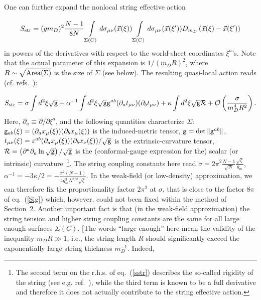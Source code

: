 \documentclass[a4paper,12pt]{article}
\begin{document}
One can further expand the nonlocal string effective action

\begin{equation}
\label{snonloc}
S_{\rm str}=(gm_D)^2\frac{N-1}{8N}\int\limits_{\Sigma(C)}^{}d\sigma_{\mu\nu}(\vec x(\xi))
\int\limits_{\Sigma(C)}^{}d\sigma_{\mu\nu}(\vec x(\xi'))D_{m_D}\left(\vec x(\xi)-\vec x(\xi')\right)
\end{equation}
in powers of the derivatives with respect to the world-sheet coordinates $\xi^a$'s. Note that the actual parameter of this expansion
is $1/(m_DR)^2$, where $R\sim\sqrt{{\rm Area}(\Sigma)}$ is the size of $\Sigma$ (see below). The resulting quasi-local action reads
(cf. refs.~\cite{dva, cristina}):

\begin{equation}
\label{sstr}
S_{\rm str}=\sigma\int d^2\xi\sqrt{\sf g}+
\alpha^{-1}\int d^2\xi\sqrt{\sf g}{\sf g}^{ab}
(\partial_at_{\mu\nu})(\partial_bt_{\mu\nu})+\kappa
\int d^2\xi\sqrt{\sf g}{\cal R}+{\cal O}\left(\frac{\sigma}{m_D^4R^2}\right).
\end{equation}
Here,
$\partial_a\equiv\partial/\partial\xi^a$, and the following quantities characterize $\Sigma$: ${\sf g}_{ab}(\xi)=
(\partial_a x_\mu(\xi))(\partial_b x_\mu(\xi))$ is the induced-metric tensor, ${\sf g}=\det\| {\sf g}^{ab}\|$,
$t_{\mu\nu}(\xi)=\varepsilon^{ab}(\partial_a
x_\mu(\xi))(\partial_b x_\nu(\xi))/\sqrt{\sf g}$ is the extrinsic-curvature tensor,
${\cal R}=\left(\partial^a\partial_a\ln
\sqrt{\sf g}\right)/\sqrt{\sf g}$ is the (conformal-gauge expression for the) scalar (or intrinsic) curvature~\footnote{The second
term on the r.h.s. of eq.~(\ref{sstr}) describes the so-called rigidity of the string (see e.g. ref.~\cite{dg}), while the third
term is known to be a full derivative and therefore it does not actually contribute to the string effective action.}.
The string coupling constants here read
$\sigma=2\pi^2\frac{N-1}{\sqrt{N}}\frac{\sqrt{\zeta}}{g_m}$,
$\alpha^{-1}=-3\kappa/2=-\frac{\pi^2(N-1)}{4g_m^3N^{3/2}\sqrt{\zeta}}$. In the weak-field (or low-density) approximation, we can therefore fix the
proportionality factor $2\pi^2$ at $\sigma$, that is close to the factor $8\pi$ of eq.~(\ref{Sig}) which, however, could not
been fixed within the method of Section~2. Another important fact is that
(in the weak-field approximation) the string tension and higher string coupling constants
are the same for all large enough surfaces $\Sigma(C)$. [The words ``large enough'' here mean the validity of the inequality
$m_DR\gg 1$, i.e., the string length $R$ should significantly exceed the exponentially large string thickness $m_D^{-1}$. Indeed,
\end{document}
